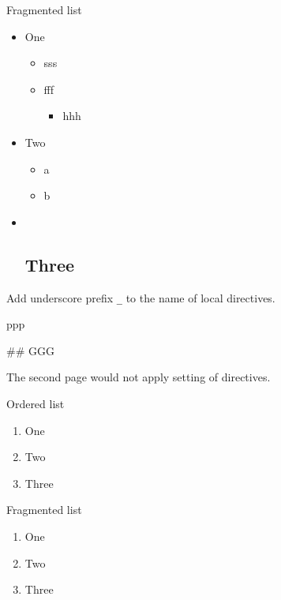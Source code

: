 \begin{frame}[fragile]{Fragmented list}

\begin{itemize}
\item
  One

  \begin{itemize}
  
  \item
    sss
  \item
    fff

    \begin{itemize}
    
    \item
      hhh
    \end{itemize}
  \end{itemize}
\item
  Two

  \begin{itemize}
  
  \item
    a
  \item
    b
  \end{itemize}
\item ~
  \subsection{Three}
\end{itemize}

Add underscore prefix \texttt{\_} to the name of local directives.

\end{frame}

\begin{frame}{ppp}

\begin{block}{\#\# GGG}

The second page would not apply setting of directives.

\end{block}

\end{frame}

\begin{frame}{Ordered list}

\begin{enumerate}

\item
  One
\item
  Two
\item
  Three
\end{enumerate}

\end{frame}

\begin{frame}{Fragmented list}

\begin{enumerate}
[1)]

\item
  One
\item
  Two
\item
  Three
\end{enumerate}

\end{frame}
